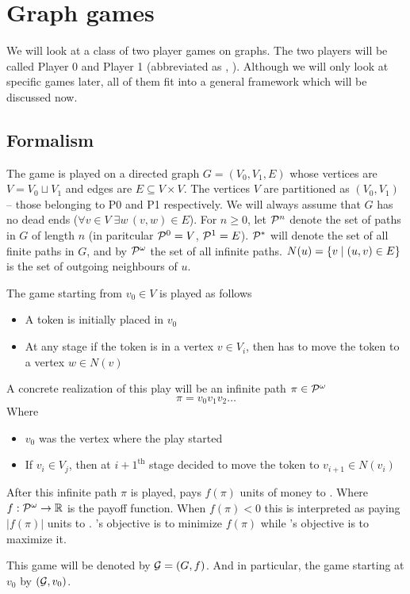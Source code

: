 \chapter{Graph games}
We will look at a class of two player games on graphs. The two players will be called Player 0 and Player 1 (abbreviated as , ). Although we will only look at specific games later, all of them fit into a general framework which will be discussed now.
\section{Formalism}
\label{sec:formalism}
The game is played on a directed graph $G=(V_0,V_1,E)$ whose vertices are $V=V_0 \sqcup V_1$ and edges are $E \subseteq V\times V$. The vertices $V$ are partitioned as $(V_0,V_1)$ -- those belonging to P0 and P1 respectively. We will always assume that $G$ has no dead ends ($\forall v \in V \; \exists w \, (v,w) \in E$). For $n \geq 0$, let $\PF[n]$ denote the set of paths in $G$ of length $n$ (in paritcular $\PF[0]=V$, $\PF[1]=E$). $\PF$ will denote the set of all finite paths in $G$, and by $\PI$ the set of all infinite paths. $N(u)=\set{v \mid (u,v) \in E}$ is the set of outgoing neighbours of $u$. 

The game starting from $v_0 \in V$ is played as follows
\begin{itemize}
  \item A token is initially placed in $v_0$
  \item At any stage if the token is in a vertex $v \in V_i$, then  has to move the token to a vertex $w \in N(v)$
\end{itemize}
A concrete realization of this play will be an infinite path $\pi \in \PI$
\[
  \pi = v_0 v_1 v_2 \ldots
\]
Where
\begin{itemize}
  \item $v_0$ was the vertex where the play started
  \item If $v_i \in V_j$, then at ${i+1}^\text{th}$ stage  decided to move the token to $v_{i+1} \in N(v_i)$
\end{itemize}
After this infinite path $\pi$ is played,  pays $f(\pi)$ units of money to . Where $f : \PI \to \Reals
$ is the payoff function. When $f(\pi) < 0$ this is interpreted as  paying $|f(\pi)|$ units to . 's objective is to minimize $f(\pi)$ while 's objective is to maximize it.

This game will be denoted by $\G=(G,f)$. And in particular, the game  starting at $v_0$ by $(\G,v_0)$.

